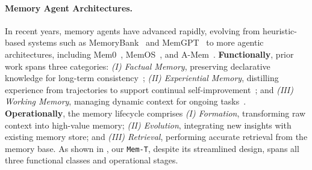 \documentclass[11pt, a4paper]{lumia}
\newcommand{\ourmethod}{{\texttt{Mem-T}}\xspace} %
\begin{document}
\paragraph{Memory Agent Architectures.} 
In recent years, memory agents have advanced rapidly, evolving from heuristic-based systems such as MemoryBank~\citep{zhong2023memorybankenhancinglargelanguage} and MemGPT~\citep{packer2023memgpt} to more agentic architectures, including Mem0~\citep{Chhikara2025mem0}, MemOS~\citep{li2025memosoperatingmemoryaugmentedgeneration}, and A-Mem~\citep{xuAMEMAgenticMemory2025}. 
\textbf{Functionally}, prior work spans three categories: \textit{(I) Factual Memory}, preserving declarative knowledge for long-term consistency~\citep{zhong2023memorybankenhancinglargelanguage}; \textit{(II) Experiential Memory}, distilling experience from trajectories to support continual self-improvement~\citep{DBLP:conf/aaai/Zhao0XLLH24}; and \textit{(III) Working Memory}, managing dynamic context for ongoing tasks~\citep{wuReSumUnlockingLongHorizon2025}. \textbf{Operationally}, the memory lifecycle comprises \textit{(I) Formation}, transforming raw context into high-value memory; \textit{(II) Evolution}, integrating new insights with existing memory store; and \textit{(III) Retrieval}, performing accurate retrieval from the memory base. As shown in , our \ourmethod, despite its streamlined design, spans all three functional classes and operational stages.


\vspace{-0.1em}
\end{document}
